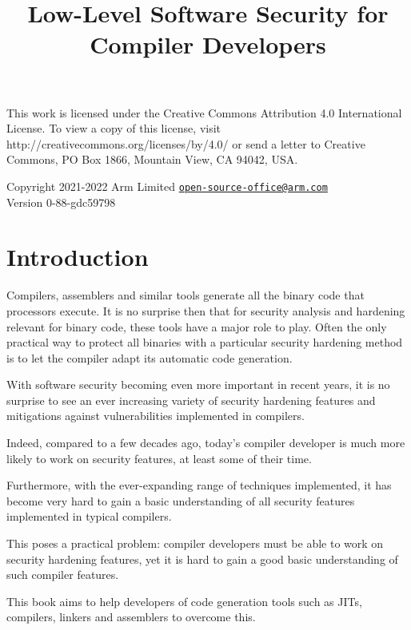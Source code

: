 \documentclass[a4paper,]{report}
\title{Low-Level Software Security for Compiler Developers}
\date{}
\begin{document}
\maketitle

\clearpage

\vspace*{\fill}
This work is licensed under the Creative Commons Attribution 4.0 International
License. To view a copy of this license, visit
http://creativecommons.org/licenses/by/4.0/ or send a letter to Creative
Commons, PO Box 1866, Mountain View, CA 94042, USA.

  Copyright 2021-2022 Arm Limited
  \href{mailto:open-source-office@arm.com}{\nolinkurl{open-source-office@arm.com}}\\

Version 0-88-gdc59798
\clearpage

{
\hypersetup{linkcolor=}
\setcounter{tocdepth}{2}
\tableofcontents
}
\hypertarget{introduction}{%
\chapter{Introduction}\label{introduction}}

Compilers, assemblers and similar tools generate all the binary code
that processors execute. It is no surprise then that for security
analysis and hardening relevant for binary code, these tools have a
major role to play. Often the only practical way to protect all binaries
with a particular security hardening method is to let the compiler adapt
its automatic code generation.

With software security becoming even more important in recent years, it
is no surprise to see an ever increasing variety of security hardening
features and mitigations against vulnerabilities implemented in
compilers.

Indeed, compared to a few decades ago, today's compiler developer is
much more likely to work on security features, at least some of their
time.

Furthermore, with the ever-expanding range of techniques implemented, it
has become very hard to gain a basic understanding of all security
features implemented in typical compilers.

This poses a practical problem: compiler developers must be able to work
on security hardening features, yet it is hard to gain a good basic
understanding of such compiler features.

This book aims to help developers of code generation tools such as JITs,
compilers, linkers and assemblers to overcome this.
\end{document}
